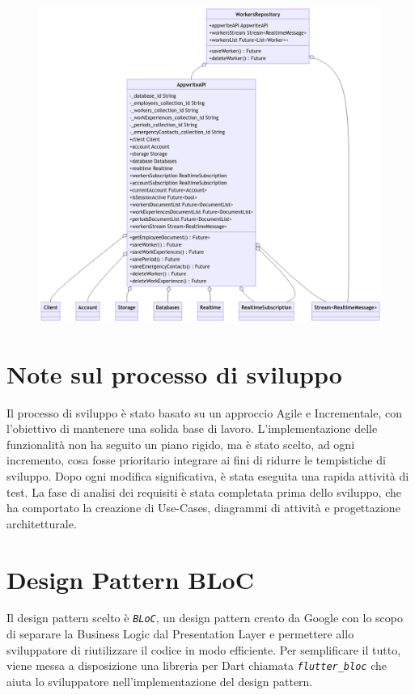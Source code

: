 \documentclass[a4paper, oneside, 12pt]{article}
\begin{document}
\begin{figure}[H]
	\centering
	\includegraphics[width = 10 cm]{images/uml_2.png}
	\label{fig:attività dipendenti}
\end{figure}



\newpage
\section{Note sul processo di sviluppo}
Il processo di sviluppo è stato basato su un approccio Agile e Incrementale, con l'obiettivo di mantenere una solida base di lavoro. 
L'implementazione delle funzionalità non ha seguito un piano rigido, ma è stato scelto, ad ogni incremento, cosa fosse prioritario integrare
ai fini di ridurre le tempistiche di sviluppo. Dopo ogni modifica significativa, è stata eseguita una rapida attività di test. La fase di analisi 
dei requisiti è stata completata prima dello sviluppo, che ha comportato la creazione di Use-Cases, diagrammi di attività e progettazione architetturale.


\newpage
\section{Design Pattern BLoC}
Il design pattern scelto è \textit{\texttt{BLoC}}, un design pattern creato da Google con lo scopo di separare la Business Logic dal Presentation Layer 
e permettere allo sviluppatore di riutilizzare il codice in modo efficiente. Per semplificare il tutto, viene messa a disposizione una libreria 
per Dart chiamata \textit{\texttt{flutter\_bloc}} che aiuta lo sviluppatore nell'implementazione del design pattern.
\end{document}
